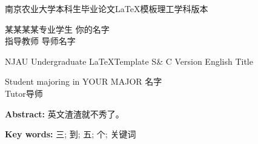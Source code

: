 \begin{center}
	 \heiti	南京农业大学本科生毕业论文\LaTeX 模板理工学科版本	\end{center}
\begin{center}
	 \fangsong	某某某某专业学生 \quad 你的名字\\	指导教师 \quad 导师名字	\end{center}



\vspace{135pt}

\begin{center}
	 NJAU Undergraduate \LaTeX Template  S\& C Version English Title \end{center}
\begin{center}
	 Student majoring in YOUR MAJOR \quad 名字\\Tutor\quad 导师\end{center}

{\renewcommand\baselinestretch{1}\selectfont
\noindent\textbf{Abstract: }英文渣渣就不秀了。
	\par}

\vspace{-0.2\baselineskip}
\noindent\textbf{Key words: } 三; 到; 五; 个; 关键词

\vspace{15pt}
\clearpage